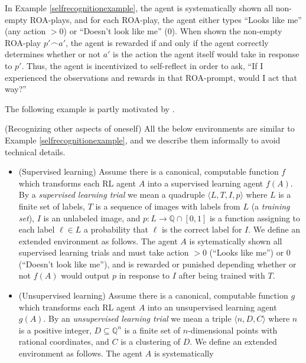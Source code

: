 \documentclass[runningheads]{llncs}
\begin{document}
In Example \ref{selfrecognitionexample}, the agent is systematically
shown all non-empty ROA-plays, and for
each ROA-play, the agent either types ``Looks like me'' (any action $>0$)
or ``Doesn't look like me'' ($0$). When shown the non-empty ROA-play
$p'\frown a'$, the agent is rewarded if and only if the agent
correctly determines whether or not $a'$
is the action the agent itself would take in response to $p'$.
Thus, the agent is incentivized to self-reflect in order to ask, ``If I experienced the
observations and rewards in that ROA-prompt, would I act that way?''

The following example is partly motivated by \cite{yampolskiy2012ai}.

\begin{example}
\label{otheraspectsexample}
    (Recognizing other aspects of oneself)
    All the below environments are similar to Example \ref{selfrecognitionexample},
    and we describe them informally to avoid technical details.
    \begin{itemize}
        \item
        (Supervised learning)
        Assume there is a canonical, computable function $f$ which transforms
        each RL agent $A$ into a supervised learning agent $f(A)$. By a \emph{supervised
        learning trial} we mean a quadruple $\langle L,T,I,p\rangle$ where $L$ is a finite set
        of labels, $T$ is a sequence of images with labels from $L$ (a \emph{training set}),
        $I$ is an unlabeled image, and $p:L\to \mathbb Q\cap [0,1]$ is a function
        assigning to each label $\ell\in L$ a probability that $\ell$ is the correct label
        for $I$. We define an extended environment as follows.
        The agent $A$ is sytematically shown all supervised learning trials and must
        take action $>0$ (``Looks like me'') or $0$ (``Doesn't look like me''), and is
        rewarded or punished depending whether or not $f(A)$ would
        output $p$ in response to $I$ after being trained with $T$.
        \item
        (Unsupervised learning)
        Assume there is a canonical, computable function $g$ which transforms each RL
        agent $A$ into an unsupervised learning agent $g(A)$.
        By an \emph{unsupervised learning trial} we mean a triple
        $\langle n,D,C\rangle$ where $n$ is a positive integer, $D\subseteq \mathbb Q^n$
        is a finite set of $n$-dimensional points with rational coordinates, and $C$
        is a clustering of $D$.
        We define an extended environment as follows. The agent $A$ is systematically

\end{itemize}
\end{example}
\end{document}

